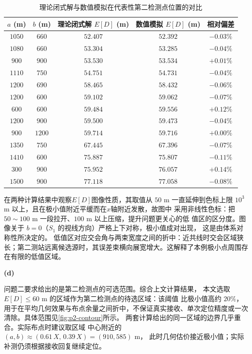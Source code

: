 \begin{table}[!htbp]
    \caption{理论闭式解与数值模拟在代表性第二检测点位置的对比}\label{tab:p2-cross}
    \centering
    \begin{tabular}{ccccc}
        \toprule
        $a$ (m) & $b$ (m) & 理论闭式解 $E[D]$ (m) & 数值模拟 $E[D]$ (m) & 相对偏差 \\
        \midrule
        $1050$ & $660$  & $52.407$ & $52.392$ & $-0.03\%$ \\
        $1080$ & $660$  & $53.304$ & $53.285$ & $-0.04\%$ \\
        $900$  & $900$  & $53.530$ & $53.534$ & $+0.01\%$ \\
        $1110$ & $750$  & $54.751$ & $54.731$ & $-0.04\%$ \\
        $1200$ & $690$  & $58.465$ & $58.432$ & $-0.06\%$ \\
        \midrule
        $1200$ & $600$  & $59.102$ & $59.062$ & $-0.07\%$ \\
        $600$  & $600$  & $59.484$ & $59.556$ & $+0.12\%$ \\
        $1200$ & $900$  & $59.500$ & $59.473$ & $-0.04\%$ \\
        $900$  & $1200$ & $59.714$ & $59.716$ & $+0.00\%$ \\
        $1350$ & $750$  & $67.445$ & $67.396$ & $-0.07\%$ \\
        \midrule
        $1410$ & $600$  & $75.887$ & $75.807$ & $-0.11\%$ \\
        $300$  & $900$  & $75.952$ & $76.057$ & $+0.14\%$ \\
        $1500$ & $900$  & $77.118$ & $77.058$ & $-0.08\%$ \\
        \bottomrule
    \end{tabular}
\end{table}


在两种计算结果中观察$E[D]$图像性质，其取值从
$50$ m 一直延伸到色标上限 $10^3$ m 以上，且在极小值附近平缓而在$x$轴附近发散，故图中
采用非线性色标：把 $50\sim100$ m 一段拉开、$100$ m 以上压缩，提升问题更关心的低
值区的区分度。图像关于 $b=0$（$S_1$ 的视线方向）严格上下对称，极小值成对出现，
这是由体系对称性所决定的。
低值区对应交会角与两束宽度之间的折中：近共线时交会区域狭长；第二测站远离候选源时，其误差束横向展宽增大。这解释了本例极小点周围存在有限的低值区域。

\noindent\textbf{(d)}\hspace{0.2em}{\heiti 待选区域确定}\songti

问题二要求给出的是第二检测点的可选范围。综合上文计算结果，
本文{\heiti 选取 $E[D]\le60$ m 的区域作为第二检测点的待选区域}：该阈值
比极小值高约 $20\%$，用于在平均几何效果与布点余量之间折中，不保证真实接收、单次定位精度或一次清除。具体范围见\cref{fig:p2-contour}所示。
两套计算给出的同一区域的边界几乎重合。实际布点时建议取区域
中心附近的 $(a,b)\approx(0.61\,X,\,0.39\,X)=(910,585)$ m，
此时几何估价接近极小值；实际补测仍须根据接收回复继续定位。


